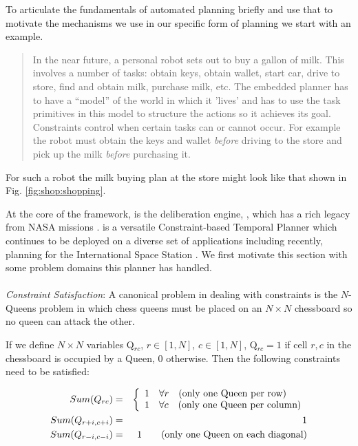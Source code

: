 To articulate the fundamentals of automated planning briefly and use
that to motivate the mechanisms we use in our specific form of
planning we start with an example.

{\small
  \begin{quote}
    In the near future, a personal robot sets out to buy a gallon of
    milk. This involves a number of tasks: obtain keys, obtain wallet,
    start car, drive to store, find and obtain milk, purchase milk,
    etc.  The embedded planner has to have a ``model'' of the world in
    which it 'lives' and has to use the task primitives in this model
    to structure the actions so it achieves its goal. Constraints
    control when certain tasks can or cannot occur. For example the
    robot must obtain the keys and wallet \emph{before} driving to the
    store and pick up the milk \emph{before} purchasing it.
\end{quote}

For such a robot the milk buying plan at the store might look like
that shown in Fig. \ref{fig:shop:shopping}.

At the core of the \rx framework, is the deliberation engine, \eue,
which has a rich legacy from NASA missions \cite{mus98,rajan00,
  jonsson00,aichang04, bresina05}. \eu is a versatile Constraint-based
Temporal Planner which continues to be deployed on a diverse set of
applications including recently, planning for the International Space
Station \cite{barreiro09}. We first motivate this section with some
problem domains this planner has handled.

\paragraph{} {\em Constraint Satisfaction}: A canonical problem in
dealing with constraints is the $N$-Queens problem in which chess
queens must be placed on an $N \times N$ chessboard so no queen can
attack the other. 

If we define $N \times N$ variables Q$_{rc}$, $r \in [1,N]$, $c \in
[1,N]$, Q$_{rc} = 1$ if cell $r,c$ in the chessboard is occupied by a
Queen, $0$ otherwise. Then the following constraints need to be
satisfied:

\begin{eqnarray*}
 Sum(Q_{rc}) & = & \left\{
   \begin{array}{l l}
     1 & \forall r \quad \mbox{(only one Queen per row)}\\
     1 & \forall c \quad \mbox{(only one Queen per column)}\\ 
   \end{array} \right. \\
Sum(Q_{r+i,c+i}) & = & 1\\
Sum(Q_{r-i,c-i}) & = & 1 \qquad \mbox{(only one Queen on each diagonal)}\\
\end{eqnarray*} 

}
